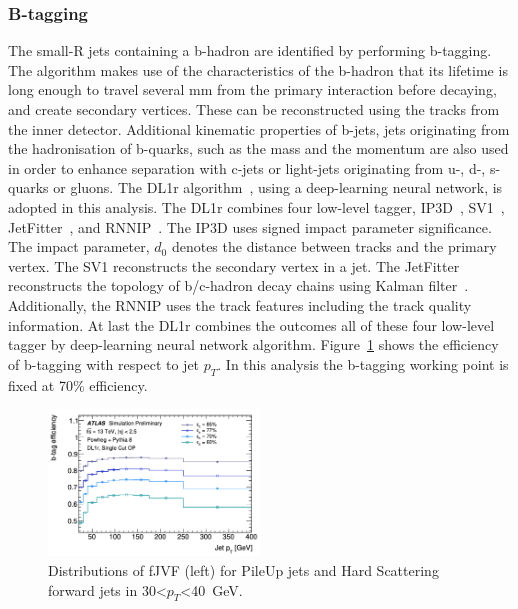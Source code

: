 \subsubsection{B-tagging}
The small-R jets containing a b-hadron are identified by performing b-tagging.
The algorithm makes use of the characteristics of the b-hadron that its lifetime is long enough to travel several mm from the primary interaction before decaying, and create secondary vertices. These can be reconstructed using the tracks from the inner detector.
Additional kinematic properties of b-jets, jets originating from the hadronisation of b-quarks, such as the mass and the momentum are also used in order to enhance separation with c-jets or light-jets originating from u-, d-, s- quarks or gluons.
The DL1r algorithm~\cite{ATL-PHYS-PUB-2020-009}, using a deep-learning neural network, is adopted in this analysis.
The DL1r combines four low-level tagger, IP3D~\cite{ATL-PHYS-PUB-2017-013}, SV1~\cite{ATL-PHYS-PUB-2017-011}, JetFitter~\cite{ATL-PHYS-PUB-2018-025}, and RNNIP~\cite{ATL-PHYS-PUB-2017-003}.
The IP3D uses signed impact parameter significance. The impact parameter, $d_0$ denotes the distance between tracks and the primary vertex.
The SV1 reconstructs the secondary vertex in a jet. The JetFitter reconstructs the topology of b/c-hadron decay chains using Kalman filter~\cite{FRUHWIRTH1987444}.
Additionally, the RNNIP uses the track features including the track quality information.
At last the DL1r combines the outcomes all of these four low-level tagger by deep-learning neural network algorithm.
Figure~\ref{fig:btageff} shows the efficiency of b-tagging with respect to jet $p_T$.
In this analysis the b-tagging working point is fixed at 70\% efficiency.
\begin{figure}[tbp]
    \begin{center}
    \includegraphics[width=0.50\textwidth,keepaspectratio]{figures/Reconstruction/btageff}
    \caption{
    Distributions of fJVF (left) for PileUp jets and Hard Scattering forward jets in 30<$p_T$<40~GeV. \cite{ATL-PHYS-PUB-2020-009}
    }
    \label{fig:btageff}
    \end{center}
\end{figure}
